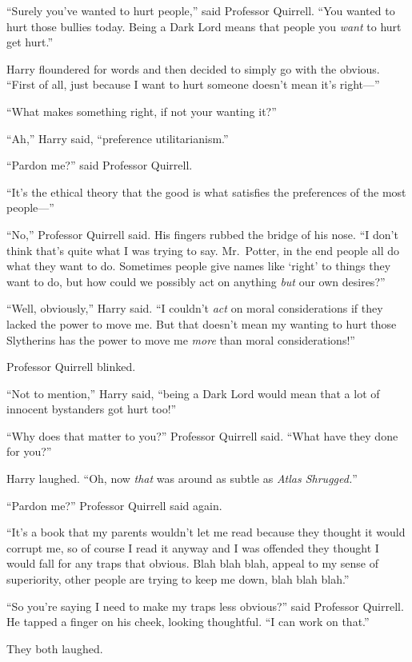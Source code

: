 ``Surely you've wanted to hurt people,'' said Professor Quirrell. ``You
wanted to hurt those bullies today. Being a Dark Lord means that people
you \emph{want} to hurt get hurt.''

Harry floundered for words and then decided to simply go with the
obvious. ``First of all, just because I want to hurt someone doesn't
mean it's right---''

``What makes something right, if not your wanting it?''

``Ah,'' Harry said, ``preference utilitarianism.''

``Pardon me?'' said Professor Quirrell.

``It's the ethical theory that the good is what satisfies the
preferences of the most people---''

``No,'' Professor Quirrell said. His fingers rubbed the bridge of his
nose. ``I don't think that's quite what I was trying to say. Mr.~Potter,
in the end people all do what they want to do. Sometimes people give
names like `right' to things they want to do, but how could we possibly
act on anything \emph{but} our own desires?''

``Well, obviously,'' Harry said. ``I couldn't \emph{act} on moral
considerations if they lacked the power to move me. But that doesn't
mean my wanting to hurt those Slytherins has the power to move me
\emph{more} than moral considerations!''

Professor Quirrell blinked.

``Not to mention,'' Harry said, ``being a Dark Lord would mean that a
lot of innocent bystanders got hurt too!''

``Why does that matter to you?'' Professor Quirrell said. ``What have
they done for you?''

Harry laughed. ``Oh, now \emph{that} was around as subtle as \emph{Atlas
Shrugged.}''

``Pardon me?'' Professor Quirrell said again.

``It's a book that my parents wouldn't let me read because they thought
it would corrupt me, so of course I read it anyway and I was offended
they thought I would fall for any traps that obvious. Blah blah blah,
appeal to my sense of superiority, other people are trying to keep me
down, blah blah blah.''

``So you're saying I need to make my traps less obvious?'' said
Professor Quirrell. He tapped a finger on his cheek, looking thoughtful.
``I can work on that.''

They both laughed.

